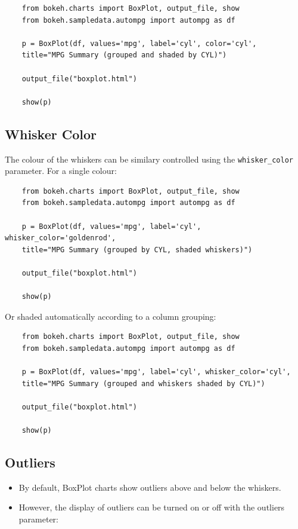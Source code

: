 \documentclass[a4paper,12pt]{article}
\begin{document}
\bigskip
{
	\large
	\begin{verbatim}
	from bokeh.charts import BoxPlot, output_file, show
	from bokeh.sampledata.autompg import autompg as df
	
	p = BoxPlot(df, values='mpg', label='cyl', color='cyl',
	title="MPG Summary (grouped and shaded by CYL)")
	
	output_file("boxplot.html")
	
	show(p)
	\end{verbatim}
}
\newpage
\subsection*{Whisker Color}
The colour of the whiskers can be similary controlled using the \texttt{whisker\_color} parameter. For a single colour:
{
	\large
	
	\begin{verbatim}
	from bokeh.charts import BoxPlot, output_file, show
	from bokeh.sampledata.autompg import autompg as df
	
	p = BoxPlot(df, values='mpg', label='cyl', whisker_color='goldenrod',
	title="MPG Summary (grouped by CYL, shaded whiskers)")
	
	output_file("boxplot.html")
	
	show(p)
	\end{verbatim}
	
}
\bigskip
\noindent Or shaded automatically according to a column grouping:\\

\bigskip
{
	\large
	\begin{verbatim}
	from bokeh.charts import BoxPlot, output_file, show
	from bokeh.sampledata.autompg import autompg as df
	
	p = BoxPlot(df, values='mpg', label='cyl', whisker_color='cyl',
	title="MPG Summary (grouped and whiskers shaded by CYL)")
	
	output_file("boxplot.html")
	
	show(p)
	\end{verbatim}
	
}
\newpage
\subsection*{Outliers}
\begin{itemize}
	\item By default, BoxPlot charts show outliers above and below the whiskers. 
	\item However, the display of outliers can be turned on or off with the outliers parameter:
\end{itemize}
\end{document}

